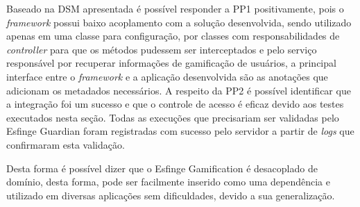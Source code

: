 \par Baseado na DSM apresentada é possível responder a PP1 positivamente, pois o \textit{framework} possui baixo acoplamento com a solução desenvolvida, sendo utilizado apenas em uma classe para configuração, por classes com responsabilidades de \textit{controller} para que os métodos pudessem ser interceptados e pelo serviço responsável por recuperar informações de gamificação de usuários, a principal interface entre o \textit{framework} e a aplicação desenvolvida são as anotações que adicionam os metadados necessários. A respeito da PP2 é possível identificar que a integração foi um sucesso e que o controle de acesso é eficaz devido aos testes executados nesta seção. Todas as execuções que precisariam ser validadas pelo Esfinge Guardian foram registradas com sucesso pelo servidor a partir de \textit{logs} que confirmaram esta validação. 
\par Desta forma é possível dizer que o Esfinge Gamification é desacoplado de domínio, desta forma, pode ser facilmente inserido como uma dependência e utilizado em diversas aplicações sem dificuldades, devido a sua generalização.